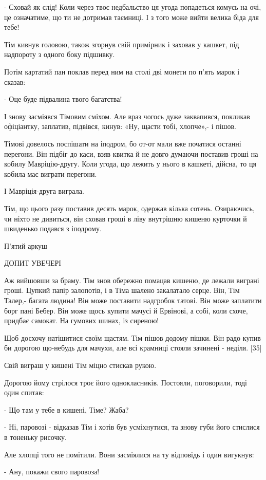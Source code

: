 - Сховай як слід! Коли через твоє недбальство ця угода попадеться комусь на очі, це означатиме, що ти не дотримав таємниці. І з того може вийти велика біда для тебе!

Тім кивнув головою, також згорнув свій примірник і заховав у кашкет, під надпороту з одного боку підшивку.

Потім картатий пан поклав перед ним на столі дві монети по п'ять марок і сказав:

- Оце буде підвалина твого багатства!

І знову засміявся Тімовим сміхом. Але враз чогось дуже заквапився, покликав офіціантку, заплатив, підвівся, кинув: «Ну, щасти тобі, хлопче»,- і пішов.

Тімові довелось поспішати на іподром, бо от-от мали вже початися останні перегони. Він підбіг до каси, взяв квитка й не довго думаючи поставив гроші на кобилу Мавріцію-другу. Коли угода, що лежить у нього в кашкеті, дійсна, то ця кобила має виграти перегони.

І Мавріція-друга виграла.

Тім, що цього разу поставив десять марок, одержав кілька сотень. Озираючись, чи ніхто не дивиться, він сховав гроші в ліву внутрішню кишеню курточки й швиденько подався з іподрому.

П'ятий аркуш

ДОПИТ УВЕЧЕРІ

Аж вийшовши за браму. Тім знов обережно помацав кишеню, де лежали виграні гроші. Цупкий папір залопотів, і в Тіма шалено закалатало серце. Він, Тім Талер,- багата людина! Він може поставити надгробок татові. Він може заплатити борг пані Бебер. Він може щось купити мачусі й Ервінові, а собі, коли схоче, придбає самокат. На гумових шинах, із сиреною!

Щоб досхочу натішитися своїм щастям. Тім пішов додому пішки. Він радо купив би дорогою що-небудь для мачухи, але всі крамниці стояли зачинені - неділя. [35]

Свій виграш у кишені Тім міцно стискав рукою.

Дорогою йому стрілося троє його однокласників. Постояли, поговорили, тоді один спитав:

- Що там у тебе в кишені, Тіме? Жаба?

- Ні, паровозі - відказав Тім і хотів був усміхнутися, та знову губи його стислися в тоненьку рисочку.

Але хлопці того не помітили. Вони засміялися на ту відповідь і один вигукнув:

- Ану, покажи свого паровоза!

